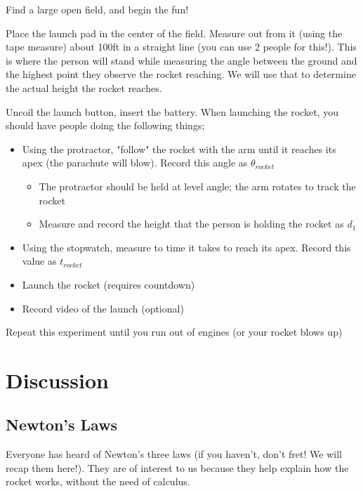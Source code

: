 \documentclass{article}
\begin{document}
Find a large open field, and begin the fun!

Place the launch pad in the center of the field.
Measure out from it (using the tape measure) about 100ft in a straight line (you can use 2 people for this!).
This is where the person will stand while measuring the angle between the ground and the highest point they observe the rocket reaching. We will use that to determine the actual height the rocket reaches.

Uncoil the launch button, insert the battery.
When launching the rocket, you should have people doing the following things;
\begin{itemize}
	\item Using the protractor, "follow" the rocket with the arm until it reaches its apex (the parachute will blow). Record this angle as $\theta_{rocket}$
	\begin{itemize}
		\item The protractor should be held at level angle; the arm rotates to track the rocket
		\item Measure and record the height that the person is holding the rocket as $d_1$
	\end{itemize}
	\item Using the stopwatch, measure to time it takes to reach its apex. Record this value as $t_{rocket}$
	\item Launch the rocket (requires countdown)
	\item Record video of the launch (optional)
\end{itemize}

Repeat this experiment until you run out of engines (or your rocket blows up)

\section{Discussion}

\subsection{Newton's Laws}

Everyone has heard of Newton's three laws (if you haven't, don't fret! We will recap them here!).
They are of interest to us because they help explain how the rocket works, without the need of calculus.
\end{document}
